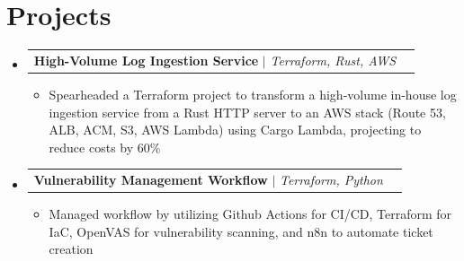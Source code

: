 \documentclass[letterpaper,11pt]{article}
\makeatletter
\newcommand{\resumeItem}[1]{
  \item\small{
    {#1 \vspace{-2pt}}
  }
}
\newcommand{\resumeProjectHeading}[2]{
    \item
    \begin{tabular*}{0.97\textwidth}{l@{\extracolsep{\fill}}r}
      \small#1 & #2 \\
    \end{tabular*}\vspace{-7pt}
}
\newcommand{\resumeSubHeadingListStart}{\begin{itemize}[leftmargin=0in, label={}]}
\newcommand{\resumeSubHeadingListEnd}{\end{itemize}}
\newcommand{\resumeItemListStart}{\begin{itemize}}
\newcommand{\resumeItemListEnd}{\end{itemize}\vspace{-5pt}}
\makeatother
\begin{document}
\section{Projects}
    \resumeSubHeadingListStart
      \resumeProjectHeading
          {\textbf{High-Volume Log Ingestion Service} $|$ \emph{Terraform, Rust, AWS}}{}
          \resumeItemListStart
            \resumeItem{Spearheaded a Terraform project to transform a high-volume in-house log ingestion service from a Rust HTTP server to an AWS stack (Route 53, ALB, ACM, S3, AWS Lambda) using Cargo Lambda, projecting to reduce costs by 60\%}
          \resumeItemListEnd
      \resumeProjectHeading
          {\textbf{Vulnerability Management Workflow} $|$ \emph{Terraform, Python}}{}
          \resumeItemListStart
            \resumeItem{Managed workflow by utilizing Github Actions for CI/CD, Terraform for IaC, OpenVAS for vulnerability scanning, and n8n to automate ticket creation}
          \resumeItemListEnd
    \resumeSubHeadingListEnd
\end{document}
